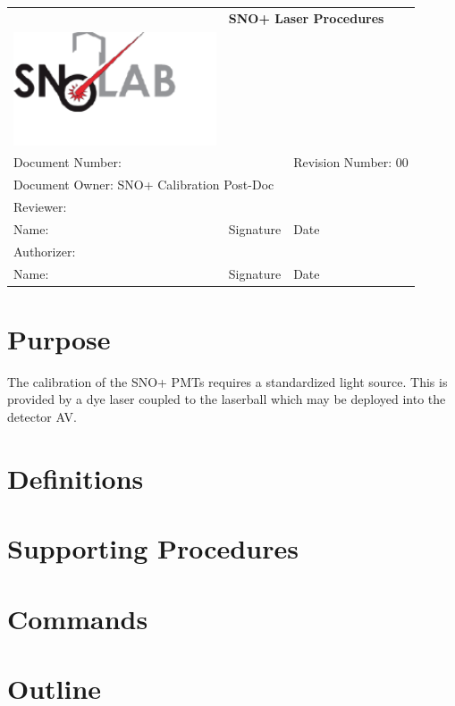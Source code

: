 \documentclass[11pt]{article}
\begin{document}
\begin{tabular}{||l|l|l||}
\hline\hline
& \multicolumn{2}{p{8cm}||}{\bf SNO+ Laser Procedures} \\
\includegraphics[width=6cm]{snolablogo.pdf} & \multicolumn{2}{p{8cm}||}{} \\
\hline
\multicolumn{2}{||p{8.5cm}|}{Document Number:} & Revision Number: 00\\
\hline
\multicolumn{3}{||l||}{Document Owner: SNO+ Calibration Post-Doc} \\
\hline
\multicolumn{3}{||l||}{Reviewer:}\\
\hline
Name: & Signature & Date \\
\hline
\multicolumn{3}{||l||}{Authorizer:}\\
\hline
Name: & Signature & Date \\
\hline\hline
\end{tabular}
\thispagestyle{empty}

\section{Purpose}

The calibration of the SNO+ PMTs requires a standardized light source. This is provided by a dye laser coupled to the laserball which may be deployed into the detector AV. 

\section{Definitions}

\section{Supporting Procedures}

\section{Commands}

\section{Outline}
\end{document}
